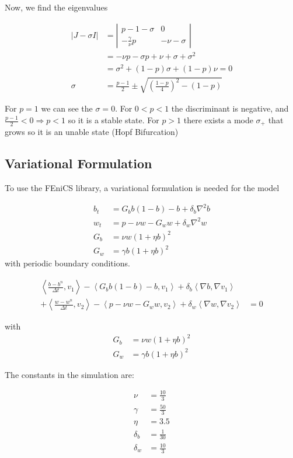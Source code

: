 Now, we find the eigenvalues

\begin{align*}
\left|J-\sigma I\right| & =\left|\begin{array}{cc}
p-1-\sigma & 0\\
-\frac{\gamma}{\nu}p & -\nu-\sigma
\end{array}\right|\\
 & =-\nu p-\sigma p+\nu+\sigma+\sigma^{2}\\
 & =\sigma^{2}+\left(1-p\right)\sigma+\left(1-p\right)\nu=0\\
\sigma & =\frac{p-1}{2}\pm\sqrt{\left(\frac{1-p}{4}\right)^{2}-\left(1-p\right)}
\end{align*}

For $p=1$ we can see the $\sigma=0$. For $0<p<1$ the discriminant
is negative, and $\frac{p-1}{2}<0\Rightarrow p<1$ so it is a stable
state. For $p>1$ there exists a mode $\sigma_{+}$ that grows so
it is an unable state (Hopf Bifurcation)

\subsection{Variational Formulation}

To use the FEniCS library, a variational formulation is needed for
the model

\begin{align*}
b_{t} & =G_{b}b\left(1-b\right)-b+\delta_{b}\nabla^{2}b\\
w_{t} & =p-\nu w-G_{w}w+\delta_{w}\nabla^{2}w\\
G_{b} & =\nu w\left(1+\eta b\right)^{2}\\
G_{w} & =\gamma b\left(1+\eta b\right)^{2}
\end{align*}
 with periodic boundary conditions.

\begin{align*}
\left\langle \frac{b-b^{n}}{\Delta t},v_{1}\right\rangle -\left\langle G_{b}b\left(1-b\right)-b,v_{1}\right\rangle +\delta_{b}\left\langle \nabla b,\nabla v_{1}\right\rangle \\
+\left\langle \frac{w-w^{n}}{\Delta t},v_{2}\right\rangle -\left\langle p-\nu w-G_{w}w,v_{2}\right\rangle +\delta_{w}\left\langle \nabla w,\nabla v_{2}\right\rangle  & =0
\end{align*}

with
\begin{align*}
G_{b} & =\nu w\left(1+\eta b\right)^{2}\\
G_{w} & =\gamma b\left(1+\eta b\right)^{2}
\end{align*}

The constants in the simulation are:

\begin{align*}
\nu & =\frac{10}{3}\\
\gamma & =\frac{50}{3}\\
\eta & =3.5\\
\delta_{b} & =\frac{1}{30}\\
\delta_{w} & =\frac{10}{3}
\end{align*}
